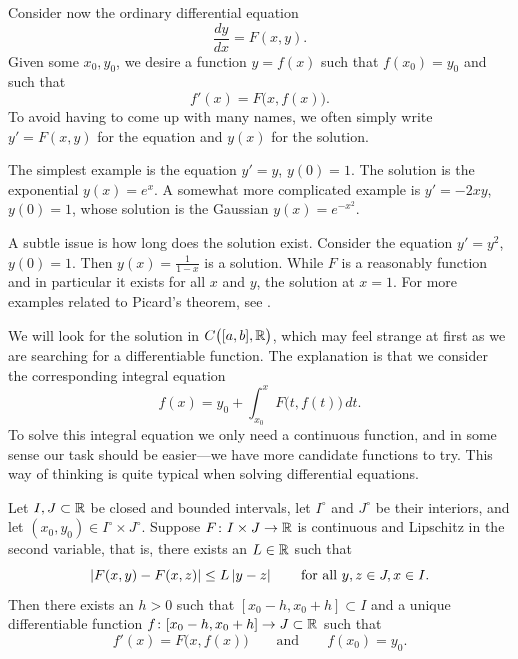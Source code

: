 \medskip

Consider now the ordinary differential equation
\begin{equation*}
\frac{dy}{dx} = F(x,y) .
\end{equation*}
Given some $x_0, y_0$, we desire a function $y=f(x)$ such that
$f(x_0) = y_0$ and such that
\begin{equation*}
f'(x) = F\bigl(x,f(x)\bigr) .
\end{equation*}
To avoid having to come up with many names, we often simply write $y' = F(x,y)$
for the equation
and $y(x)$ for the solution.

The simplest example is the equation $y' = y$, $y(0) = 1$.
The solution is the exponential $y(x) = e^x$.  A somewhat more complicated
example is $y' = -2xy$, $y(0) = 1$, whose solution is the Gaussian
$y(x) = e^{-x^2}$.

A subtle issue is how long does the solution exist.
Consider the equation $y' = y^2$, $y(0)=1$.  Then $y(x) = \frac{1}{1-x}$ is a
solution.  While $F$ is a reasonably  function and in particular
it exists for all $x$ and $y$, the solution  at $x=1$.
For more examples related to Picard's theorem, see .

We will look for the solution in 
$C\bigl([a,b],{\mathbb{R}}\bigr)$, which may feel strange at first as
we are searching for a differentiable function.
The explanation is that we consider the
corresponding integral equation
\begin{equation*}
f(x)
=
y_0 + \int_{x_0}^x F\bigl(t,f(t)\bigr)\,dt .
\end{equation*}
To solve this integral equation we only need a continuous function, and
in some sense our task should be easier---we have more candidate functions
to try.  This way of thinking is quite typical when solving differential
equations.

\begin{samepage}
\begin{thm}%
Let $I, J \subset {\mathbb{R}}$ be closed and bounded intervals,
let $I^\circ$ and $J^\circ$ be their interiors, and 
let $(x_0,y_0) \in I^\circ \times J^\circ$.
Suppose $F \colon I \times J \to {\mathbb{R}}$ is continuous
and Lipschitz in the second variable, that is, there exists
an $L \in {\mathbb{R}}$ such that
\begin{equation*}
\left\lvert {F(x,y) - F(x,z)} \right\rvert \leq L \left\lvert {y-z} \right\rvert
\qquad \text{for all } y,z \in J, x \in I .
\end{equation*}
Then there exists an $h > 0$ such that $[x_0-h,x_0+h] \subset I$ and a unique differentiable
function $f \colon [x_0 - h, x_0 + h] \to J \subset {\mathbb{R}}$ such that
\begin{equation*}
f'(x) = F\bigl(x,f(x)\bigr) \qquad \text{and} \qquad f(x_0) = y_0.
\end{equation*}
\end{thm}
\end{samepage}

